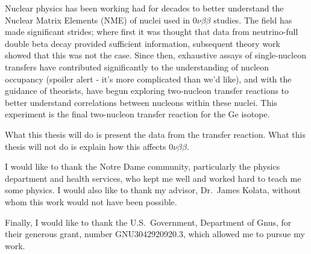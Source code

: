 \documentclass[textrefs,final,noinfo,12pt]{nddiss2e}
\newcommand{\zvbb}{$0\nu\beta\beta$\xspace}
\begin{document}
\begin{preface}
  Nuclear physics has been working had for decades to better understand the Nuclear Matrix Elements (NME) of nuclei used in \zvbb studies.  The field has made significant strides; where first it was thought that data from neutrino-full double beta decay provided sufficient information, subsequent theory work showed that this was not the case.  Since then, exhaustive assays of single-nucleon transfers have contributed significantly to the understanding of nucleon occupancy (spoiler alert - it's more complicated than we'd like), and with the guidance of theorists, have begun exploring two-nucleon transfer reactions to better understand correlations between nucleons within these nuclei.  This experiment is the final two-nucleon transfer reaction for the Ge isotope.

  What this thesis will do is present the data from the transfer reaction.  What this thesis will not do is explain how this affects \zvbb.
\end{preface}

\begin{acknowledge}
  I would like to thank the Notre Dame community, particularly the physics department and health services, who kept me well and worked hard to teach me some physics.  I would also like to thank my advisor, Dr.\ James Kolata, without
  whom this work would not have been possible.

  Finally, I would like to thank the U.S.\ Government, Department of
  Gnus, for their generous grant, number GNU3042920920.3, which
  allowed me to pursue my work.
\end{acknowledge}

\begin{symbols}
\end{symbols}

\mainmatter
\setcounter{chapter}{0}
%
%




%
%




%
%


\end{document}
